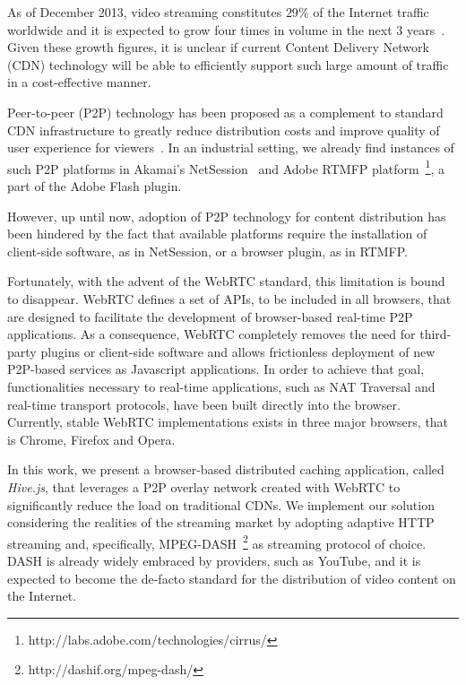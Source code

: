 \documentclass{sig-alternate}
\begin{document}

As of December 2013, video streaming constitutes $29\%$ of the Internet traffic worldwide
and it is expected to grow four times in volume in the next $3$ years~\cite{cisco}.  Given
these growth figures, it is unclear if current Content Delivery Network (CDN) technology
will be able to efficiently support such large amount of traffic in a cost-effective manner.

Peer-to-peer (P2P) technology has been proposed as a complement to standard CDN
infrastructure to greatly reduce distribution costs and improve quality of user experience
for viewers~\cite{cdn-p2p}. In an industrial setting, we already find instances of such
P2P platforms in Akamai's NetSession~\cite{netsession} and Adobe RTMFP
platform~\footnote{http://labs.adobe.com/technologies/cirrus/}, a part of the Adobe Flash plugin.

However, up until now, adoption of P2P technology for content distribution has been
hindered by the fact that available platforms require the installation of client-side
software, as in NetSession, or a browser plugin, as in RTMFP.

Fortunately, with the advent of the WebRTC standard, this limitation is bound to
disappear. WebRTC defines a set of APIs, to be included in all browsers, that are designed
to facilitate the development of browser-based real-time P2P applications. As a
consequence, WebRTC completely removes the need for third-party plugins or client-side
software and allows frictionless deployment of new P2P-based services as Javascript
applications. In order to achieve that goal, functionalities necessary to real-time
applications, such as NAT Traversal and real-time transport protocols, have been built
directly into the browser. Currently, stable WebRTC implementations exists in three major
browsers, that is Chrome, Firefox and Opera.

In this work, we present a browser-based distributed caching application, called
\textit{Hive.js}, that leverages a P2P overlay network created with WebRTC to
significantly reduce the load on traditional CDNs. We implement our solution considering
the realities of the streaming market by adopting adaptive HTTP streaming and,
specifically, MPEG-DASH~\footnote{http://dashif.org/mpeg-dash/} as streaming protocol of
choice. DASH is already widely embraced by providers, such as YouTube, and it is expected
to become the de-facto standard for the distribution of video content on the Internet.
\end{document}
